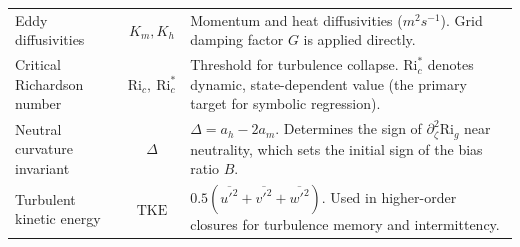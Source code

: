 \documentclass[11pt, a4paper]{article}
\begin{document}
\begin{table}[t]
\begin{tabularx}{\linewidth}{l c X}
Eddy diffusivities & $K_m, K_h$ & Momentum and heat diffusivities ($m^2 s^{-1}$). Grid damping factor $G$ is applied directly. \\
\addlinespace

Critical Richardson number & $\mathrm{Ri}_c,\ \mathrm{Ri}_c^\ast$ & Threshold for turbulence collapse. $\mathrm{Ri}_c^\ast$ denotes dynamic, state-dependent value (the primary target for symbolic regression). \\
\addlinespace

Neutral curvature invariant & $\Delta$ & $\Delta = a_h - 2 a_m$. Determines the sign of $\partial_\zeta^2 \mathrm{Ri}_g$ near neutrality, which sets the initial sign of the bias ratio $B$. \\
\addlinespace

Turbulent kinetic energy & $\text{TKE}$ & $0.5(\overline{u'^2}+\overline{v'^2}+\overline{w'^2})$. Used in higher-order closures for turbulence memory and intermittency. \\

\bottomrule
\end{tabularx}
\end{table}
\end{document}
